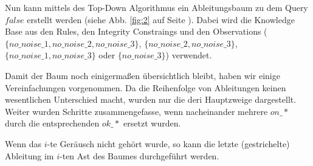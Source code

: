 \documentclass[a4paper]{scrartcl}
\begin{document}
Nun kann mittels des Top-Down Algorithmus ein Ableitungsbaum zu dem Query
$false$ erstellt werden (siehe Abb. \ref{fig:2} auf Seite \pageref{fig:2}).
Dabei wird die Knowledge Base aus den Rules, den Integrity Constraings und den
Observations ($\{no\_noise\_1, no\_noise\_2, no\_noise\_3\}$, $\{no\_noise\_2,
no\_noise\_3\}$, $\{no\_noise\_1, no\_noise\_3\}$ oder $\{no\_noise\_3\}$)
verwendet.

Damit der Baum noch einigermaßen übersichtlich bleibt, haben wir einige
Vereinfachungen vorgenommen. Da die Reihenfolge von Ableitungen keinen
wesentlichen Unterschied macht, wurden nur die deri Hauptzweige dargestellt.
Weiter wurden Schritte zusammengefasse, wenn nacheinander mehrere $on\_\ast$
durch die entsprechenden $ok\_\ast$ ersetzt wurden.

Wenn das $i$-te Geräusch nicht gehört wurde, so kann die letzte (gestrichelte)
Ableitung im $i$-ten Ast des Baumes durchgeführt werden.
\end{document}
